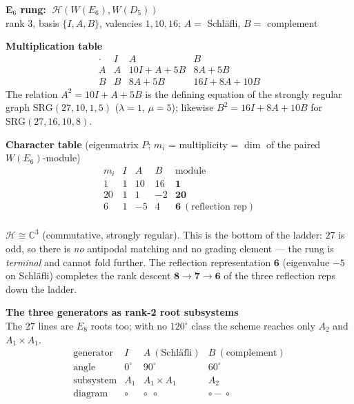 \documentclass[10pt]{article}
\begin{document}
\clearpage

\begin{center}{\Large\bfseries E$_6$ rung: $\ \mathcal H(W(E_6),W(D_5))$}\\[2pt]
{\small rank 3, basis $\{I,A,B\}$, valencies $1,10,16$;
$A=$ Schl\"afli, $B=$ complement}\end{center}
\vspace{10pt}

{\bfseries Multiplication table} 
\[
\renewcommand{\arraystretch}{1.4}
\begin{array}{c|ccc}
\cdot & I & A & B\\\hline
A & A & 10I{+}A{+}5B & 8A{+}5B\\
B & B & 8A{+}5B & 16I{+}8A{+}10B
\end{array}
\]
The relation $A^2=10I+A+5B$ is the defining equation of the strongly regular
graph $\mathrm{SRG}(27,10,1,5)$ ($\lambda=1$, $\mu=5$); likewise
$B^2=16I+8A+10B$ for $\mathrm{SRG}(27,16,10,8)$.
\vspace{6pt}

{\bfseries Character table} (eigenmatrix $P$; $m_i$ = multiplicity = $\dim$ of
the paired $W(E_6)$-module)
\[
\renewcommand{\arraystretch}{1.25}
\begin{array}{c|ccc|l}
m_i & I & A & B & \text{module}\\\hline
1 & 1 & 10 & 16 & \mathbf 1\\
20 & 1 & 1 & -2 & \mathbf{20}\\
6 & 1 & -5 & 4 & \mathbf 6\ (\text{reflection rep})\\
\end{array}
\]
\vspace{2pt}

{\small $\mathcal H\cong\mathbb C^3$ (commutative, strongly regular). This is the
bottom of the ladder: $27$ is odd, so there is \emph{no} antipodal matching and
no grading element --- the rung is \emph{terminal} and cannot fold further. The
reflection representation $\mathbf 6$ (eigenvalue $-5$ on Schl\"afli) completes
the rank descent $\mathbf 8\!\to\!\mathbf 7\!\to\!\mathbf 6$ of the three
reflection reps down the ladder.}

\vspace{10pt}
{\bfseries The three generators as rank-2 root subsystems}\\[2pt]
{\small The $27$ lines are $E_8$ roots too; with no $120^\circ$ class the scheme
reaches only $A_2$ and $A_1{\times}A_1$.}
\[
\renewcommand{\arraystretch}{1.35}
\begin{array}{r|ccc}
\text{generator} & I & A\ (\text{Schl\"afli}) & B\ (\text{complement})\\\hline
\text{angle} & 0^\circ & 90^\circ & 60^\circ\\
\text{subsystem} & A_1 & A_1{\times}A_1 & A_2\\
\text{diagram} & \circ & \circ\ \ \circ & \circ\!\!-\!\!\circ
\end{array}
\]
\end{document}
